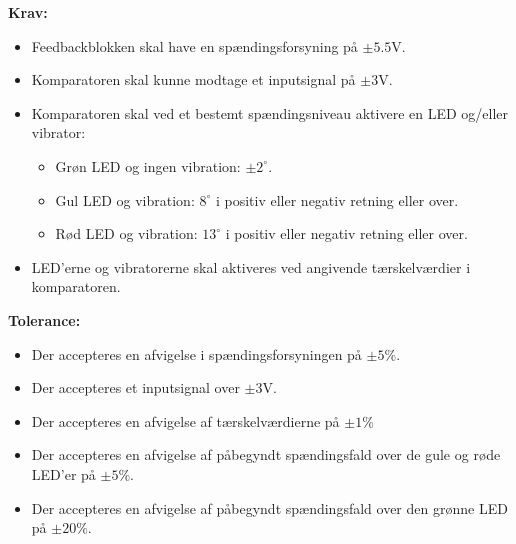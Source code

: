 \textbf{Krav:} 
\begin{itemize}
	\item Feedbackblokken skal have en spændingsforsyning på $\pm5.5$V.
	\item Komparatoren skal kunne modtage et inputsignal på $\pm3$V.
	\item Komparatoren skal ved et bestemt spændingsniveau aktivere en LED og/eller vibrator:
	\begin{itemize}
		\item Grøn LED og ingen vibration: $\pm2^{\circ}$.
		\item Gul LED og vibration: $8^{\circ}$ i positiv eller negativ retning eller over.
		\item Rød LED og vibration: $13^{\circ}$ i positiv eller negativ retning eller over.
	\end{itemize}
	\item LED'erne og vibratorerne skal aktiveres ved angivende tærskelværdier i komparatoren.
\end{itemize}
\textbf{Tolerance:}
\begin{itemize}
	\item Der accepteres en afvigelse i spændingsforsyningen på $\pm5\%$.
	\item Der accepteres et inputsignal over $\pm3$V.
	\item Der accepteres en afvigelse af tærskelværdierne på $\pm1\%$
	\item Der accepteres en afvigelse af påbegyndt spændingsfald over de gule og røde LED'er på $\pm5\%$.
	\item Der accepteres en afvigelse af påbegyndt spændingsfald over den grønne LED på $\pm20\%$.
\end{itemize}
